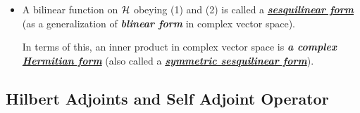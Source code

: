 \documentclass[11pt]{article}
\begin{document}
\begin{itemize}
\item \begin{remark}
A bilinear function on ${\mathcal H}$ obeying (1) and (2) is called a \underline{\emph{\textbf{sesquilinear form}}} (as a generalization of \emph{\textbf{blinear form}} in complex vector space). 

In terms of this, an inner product in complex vector space is \emph{\textbf{a complex \underline{Hermitian form}}} (also called a \underline{\emph{\textbf{symmetric sesquilinear form}}}).
\end{remark}
\end{itemize}

\subsection{Hilbert Adjoints and Self Adjoint Operator}
\end{document}
